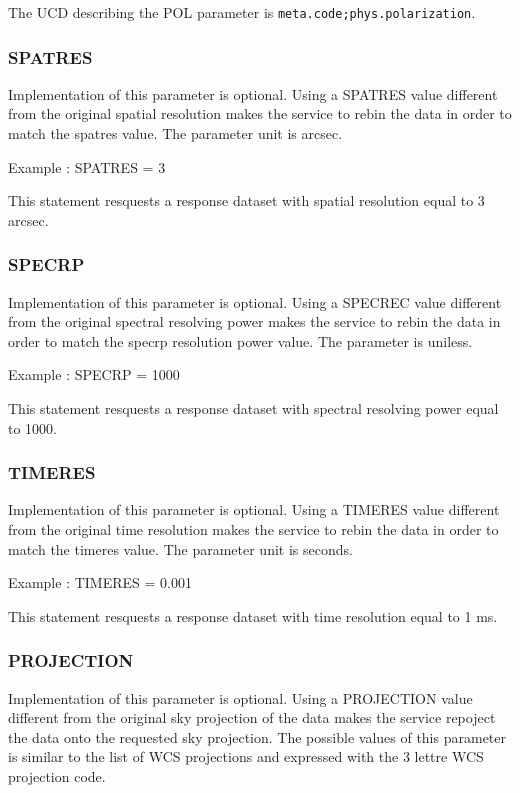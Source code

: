 \documentclass[11pt,a4paper]{ivoa}
\newcommand{\ucd}[1]{\texttt{#1}}
\begin{document}
The UCD  describing the POL parameter is
\ucd{meta.code;phys.polarization}.

\subsubsection{SPATRES}

Implementation of this parameter is optional. Using a SPATRES value different from the original spatial resolution makes the service to rebin the data in order to match the spatres value. The parameter unit is arcsec.  

Example : SPATRES = 3  

This statement resquests a response dataset with spatial resolution equal to 3 arcsec.

\subsubsection{SPECRP}

Implementation of this parameter is optional. Using a SPECREC value different from the original spectral resolving power makes the service to rebin the data in order to match the specrp resolution power value. The parameter is uniless.  

Example : SPECRP = 1000  

This statement resquests a response dataset with spectral resolving power  equal to 1000.

\subsubsection{TIMERES}

Implementation of this parameter is optional. Using a TIMERES value different from the original time resolution  makes the service to rebin the data in order to match the timeres value. The parameter unit is seconds.  

Example : TIMERES = 0.001  

This statement resquests a response dataset with time resolution equal to 1 ms.

\subsubsection{PROJECTION}

Implementation of this parameter is optional. Using a PROJECTION value different from the original sky projection of the data makes the service repoject the data onto the requested sky projection. The possible values of this parameter is similar to the list of WCS projections and expressed with the 3 lettre WCS projection code.
\end{document}
